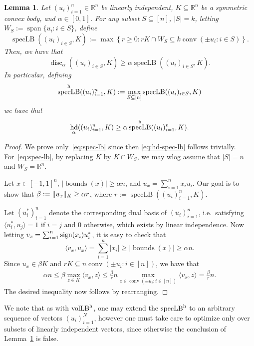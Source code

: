 \documentclass[11pt]{article}
\newtheorem{lemma}{Lemma}
\newcommand{\R}{{\mathbb{R}}}
\newcommand{\inner}[2]{\langle #1, #2 \rangle}
\newcommand{\set}[1]{\left\{ #1 \right\}}
\DeclareMathOperator{\vollb}{volLB}
\DeclareMathOperator{\disc}{disc}
\DeclareMathOperator{\hd}{hd}
\DeclareMathOperator{\conv}{conv}
\DeclareMathOperator{\lspan}{span}
\DeclareMathOperator{\speclb}{specLB}
\DeclareMathOperator{\bnds}{bounds}
\DeclarePairedDelimiter\norm{\lVert}{\rVert}
\begin{document}
\begin{lemma}
\label{lem:speclb}
Let $(u_i)_{i=1}^n \in \R^n$ be linearly independent, $K \subseteq \R^n$ be a
symmetric convex body, and $\alpha \in [0,1]$. For any subset $S \subseteq [n]$,
$|S|=k$, letting $W_S := \lspan\{u_i: i \in S\}$, define
\[
\speclb((u_i)_{i \in S},K) := 
\max \set{r \geq 0: r K \cap W_S \subseteq k \conv(\pm u_i: i \in S)}.
\]
Then, we have that
\begin{equation}
\label{eq:spec-lb}
\disc_\alpha((u_i)_{i \in S},K) \geq \alpha \speclb((u_i)_{i \in S},K).
\end{equation}
In particular, defining
\[
\speclb^{\rm h}((u_i)_{i=1}^n,K) := \max_{S \subseteq [n]} \speclb((u_i)_{i \in
S},K)
\]
we have that
\begin{equation}
\label{eq:hd-spec-lb}
\hd_{\alpha}((u_i)_{i=1}^n,K) \geq \alpha \speclb^{\rm h}((u_i)_{i=1}^n,K).
\end{equation}
\end{lemma}
\begin{proof}
We prove only~\eqref{eq:spec-lb} since then \eqref{eq:hd-spec-lb} follows
trivially. For~\eqref{eq:spec-lb}, by replacing $K$ by $K \cap W_S$, we may wlog
assume that $|S|=n$ and $W_S = \R^n$. 

Let $x \in [-1,1]^n$, $|\bnds(x)| \geq \alpha n$, and $u_x = \sum_{i=1}^n x_i
u_i$. Our goal is to show that $\beta := \norm{u_x}_K \geq \alpha r$, where $r
:= \speclb((u_i)_{i=1}^n,K)$.

Let $(u_i^*)_{i=1}^n$ denote the corresponding dual basis of
$(u_i)_{i=1}^n$, i.e.~satisfying $\inner{u_i^*}{u_j} = 1$ if $i=j$ and $0$
otherwise, which exists by linear independence. Now letting $v_x =
\sum_{i=1}^n {\rm sign}(x_i) u_i^*$, it is easy to check that 
\[
\inner{v_x}{u_x} = \sum_{i=1}^n |x_i| \geq |\bnds(x)| \geq \alpha n .
\]
Since $u_x \in \beta K$ and $r K \subseteq n \conv(\pm u_i: i
\in [n])$, we have that
\begin{align*}
\alpha n \leq \beta \max_{z \in K} \inner{v_x}{z} 
         \leq \frac{\beta}{r} n 
               \max_{z \in \conv(\pm u_i: i \in [n])} \inner{v_x}{z}
          = \frac{\beta}{r} n .
\end{align*}
The desired inequality now follows by rearranging.
\end{proof}

We note that as with $\vollb^{\rm h}$, one may extend the $\speclb^{\rm h}$ to
an arbitrary sequence of vectors $(u_i)_{i=1}^N$, however one must take care to
optimize only over subsets of linearly independent vectors, since otherwise the
conclusion of Lemma~\ref{lem:speclb} is false.
\end{document}
